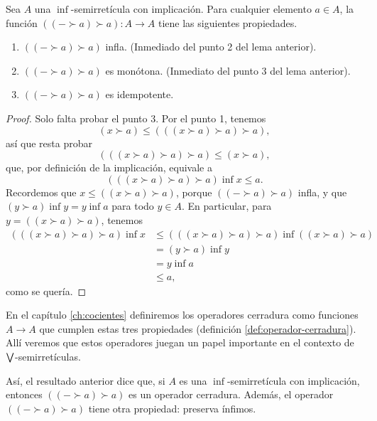 \begin{lemma}
  \label{lemma:w-cerradura}
  Sea $A$ una $\inf$-semirretícula con implicación.
  Para cualquier elemento $a\in A$, la función
  $((-\succ a)\succ a):A\to A$ tiene las siguientes propiedades.
  \begin{enumerate}
    \item $((-\succ a)\succ a)$ infla.
    (Inmediado del punto 2 del lema anterior).
    \item $((-\succ a)\succ a)$ es monótona.
      (Inmediato del punto 3 del lema anterior).
    \item $((-\succ a)\succ a)$ es idempotente.
  \end{enumerate}
\end{lemma}
\begin{proof}
  Solo falta probar el punto 3.
  Por el punto 1, tenemos
  \[
    (x\succ a) \leq (((x\succ a)\succ a)\succ a),
  \]
  así que resta probar
  \[
     (((x\succ a)\succ a)\succ a) \leq (x\succ a),
  \]
  que, por definición de la implicación, equivale a
  \[
     (((x\succ a)\succ a)\succ a) \inf x \leq a.
  \]
  Recordemos que $x\leq ((x\succ a)\succ a)$, porque $((-\succ
  a)\succ a)$ infla, y que
  $(y\succ a)\inf y = y\inf a$ para todo $y\in A$.
  En particular, para $y=((x\succ a)\succ a)$, tenemos
  \begin{align*}
     (((x\succ a)\succ a)\succ a) \inf x
     &\leq (((x\succ a)\succ a)\succ a)
       \inf ((x\succ a)\succ a) \\
     &= (y\succ a) \inf y \\
     &= y \inf a \\
     &\leq a,
  \end{align*}
  como se quería. 
\end{proof}

En el capítulo \ref{ch:cocientes} definiremos los operadores
cerradura como funciones $A\to A$ que cumplen estas tres
propiedades (definición \ref{def:operador-cerradura}).
Allí veremos que estos operadores juegan un papel
importante en el contexto de $\bigvee$-semirretículas.

Así, el resultado anterior dice que, si $A$ es una
$\inf$-semirretícula con implicación,
entonces $((-\succ a)\succ a)$ es un operador cerradura.
Además, el operador $((-\succ a)\succ a)$ tiene otra propiedad:
preserva ínfimos.

